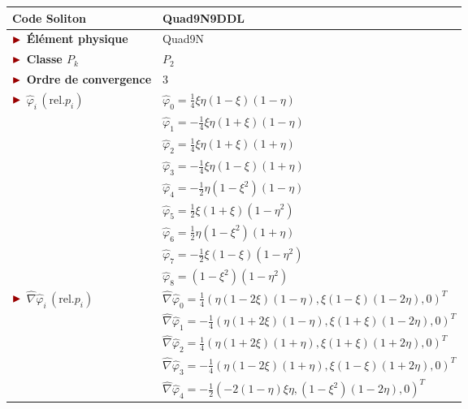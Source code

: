 \begin{table}[H]
\begin{minipage}[t]{0.48\linewidth}
		\label{tab:Quad9N}
	\end{minipage}\hfill
	\begin{minipage}[t]{0.48\linewidth}
		\centering
		\hspace*{-2.25cm}
		\begin{tabular}{>{\bfseries} l|l}
			\toprule %
			\rowcolor{black!10}\rowstyle{\color{MyRed}\bfseries} Code Soliton & \textcolor{MyRed}{\textbf{Quad9N9DDL}}\\
			\midrule
			$\mytriangle$ Élément physique & \textcolor{MyRed}{Quad9N}\\
			$\mytriangle$ Classe $P_k$ & $P_2$\\
			$\mytriangle$ Ordre de convergence & 3\\
			\midrule
			$\mytriangle$ $\widehat{\varphi}_i\, (\text{rel.} p_i)$ &  $\widehat{\varphi}_0 = \frac{1}{4}\xi\eta(1-\xi)(1-\eta)$\\
			&  $\widehat{\varphi}_1 = -\frac{1}{4}\xi\eta(1+\xi)(1-\eta)$\\
			&  $\widehat{\varphi}_2 = \frac{1}{4}\xi\eta(1+\xi)(1+\eta)$\\
			&  $\widehat{\varphi}_3 = -\frac{1}{4}\xi\eta(1-\xi)(1+\eta)$\\
			&  $\widehat{\varphi}_4 = -\frac{1}{2}\eta(1-\xi^2)(1-\eta)$\\
			&  $\widehat{\varphi}_5 = \frac{1}{2}\xi(1+\xi)(1-\eta^2)$\\
			&  $\widehat{\varphi}_6 = \frac{1}{2}\eta(1-\xi^2)(1+\eta)$\\
			&  $\widehat{\varphi}_7 = -\frac{1}{2}\xi(1-\xi)(1-\eta^2)$\\
			&  $\widehat{\varphi}_8 = (1-\xi^2)(1-\eta^2)$\\
			\midrule
			$\mytriangle$ $\widehat{\nabla}\widehat{\varphi}_i\, (\text{rel.} p_i)$ & $\widehat{\nabla}\widehat{\varphi}_0 =  \frac{1}{4}\left(\eta(1-2\xi)(1-\eta), \xi(1-\xi)(1-2\eta), 0\right)^T$ \\
			& $\widehat{\nabla}\widehat{\varphi}_1 = -\frac{1}{4}\left(\eta(1+2\xi)(1-\eta), \xi(1+\xi)(1-2\eta), 0\right)^T$ \\
			& $\widehat{\nabla}\widehat{\varphi}_2 = \frac{1}{4}\left(\eta(1+2\xi)(1+\eta), \xi(1+\xi)(1+2\eta), 0\right)^T$ \\
			& $\widehat{\nabla}\widehat{\varphi}_3 = -\frac{1}{4}\left(\eta(1-2\xi)(1+\eta), \xi(1-\xi)(1+2\eta), 0\right)^T$ \\
			& $\widehat{\nabla}\widehat{\varphi}_4 = -\frac{1}{2}\left(-2(1-\eta)\xi\eta, (1-\xi^2)(1-2\eta), 0\right)^T$ \\

\end{tabular}
\end{minipage}
\end{table}
